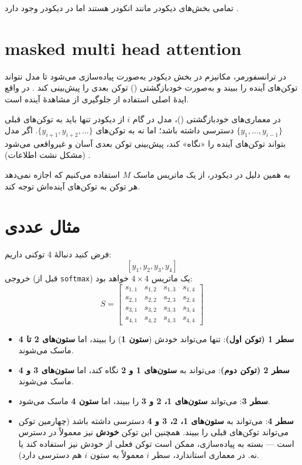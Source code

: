 تمامی بخش‌های دیکودر مانند انکودر هستند اما در دیکودر  وجود دارد \cite{vaswani2017attention}.

\section{masked multi head attention}
در ترانسفورمر، مکانیزم  در بخش دیکودر به‌صورت  پیاده‌سازی می‌شود تا مدل نتواند توکن‌های آینده را ببیند و به‌صورت خودبازگشتی () توکن بعدی را پیش‌بینی کند \cite{vaswani2017attention}.  
در واقع ایدهٔ اصلی استفاده از  جلوگیری از مشاهدهٔ آینده است.

در معماری‌های خودبازگشتی ()، مدل در گام \( i \) از دیکودر تنها باید به توکن‌های قبلی \( \{ y_1, \dots, y_{i-1} \} \) دسترسی داشته باشد؛ اما نه به توکن‌های \( \{ y_{i+1}, y_{i+2}, \dots \} \). اگر مدل بتواند توکن‌های آینده را «نگاه» کند، پیش‌بینی توکن بعدی آسان و غیرواقعی می‌شود (مشکل نشت اطلاعات) \cite{bahdanau2014neural,sutskever2014sequence}.

به همین دلیل در  دیکودر، از یک ماتریس ماسک \( M \) استفاده می‌کنیم که اجازه نمی‌دهد هر توکن به توکن‌های آینده‌اش توجه کند.

\section{مثال عددی }
فرض کنید دنبالهٔ 4 توکنی داریم:
\[
[y_1, y_2, y_3, y_4]
\]
خروجی  (قبل از \texttt{softmax}) یک ماتریس \(4 \times 4\) خواهد بود:
\[
S =
\begin{bmatrix}
	s_{1,1} & s_{1,2} & s_{1,3} & s_{1,4} \\
	s_{2,1} & s_{2,2} & s_{2,3} & s_{2,4} \\
	s_{3,1} & s_{3,2} & s_{3,3} & s_{3,4} \\
	s_{4,1} & s_{4,2} & s_{4,3} & s_{4,4}
\end{bmatrix}
\]

\begin{itemize}
	\item \textbf{سطر 1 (توکن اول)}: تنها می‌تواند خودش (\textbf{ستون 1}) را ببیند، اما \textbf{ستون‌های 2 تا 4} ماسک می‌شوند.
	\item \textbf{سطر 2 (توکن دوم)}: می‌تواند به \textbf{ستون‌های 1 و 2} نگاه کند، اما \textbf{ستون‌های 3 و 4} ماسک می‌شوند.
	\item \textbf{سطر 3}: می‌تواند \textbf{ستون‌های 1، 2 و 3} را ببیند، اما \textbf{ستون 4} ماسک می‌شود.
	\item \textbf{سطر 4}: می‌تواند به \textbf{ستون‌های 1، 2، 3 و 4} دسترسی داشته باشد (چهارمین توکن می‌تواند توکن‌های قبلی را ببیند. همچنین این توکن \textbf{خودش} نیز معمولاً در دسترس است — بسته به پیاده‌سازی، ممکن است توکن فعلی از خودش نیز استفاده کند یا نه. در معماری استاندارد، سطر \( i \) معمولاً به ستون \( i \) هم دسترسی دارد).
\end{itemize}

